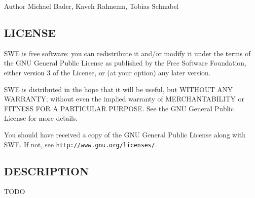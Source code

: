 \begin{DoxyAuthor}{Author}
Michael Bader, Kaveh Rahnema, Tobias Schnabel
\end{DoxyAuthor}
\hypertarget{Writer_8hh_LICENSE}{}\subsection{L\-I\-C\-E\-N\-S\-E}\label{Writer_8hh_LICENSE}
S\-W\-E is free software\-: you can redistribute it and/or modify it under the terms of the G\-N\-U General Public License as published by the Free Software Foundation, either version 3 of the License, or (at your option) any later version.

S\-W\-E is distributed in the hope that it will be useful, but W\-I\-T\-H\-O\-U\-T A\-N\-Y W\-A\-R\-R\-A\-N\-T\-Y; without even the implied warranty of M\-E\-R\-C\-H\-A\-N\-T\-A\-B\-I\-L\-I\-T\-Y or F\-I\-T\-N\-E\-S\-S F\-O\-R A P\-A\-R\-T\-I\-C\-U\-L\-A\-R P\-U\-R\-P\-O\-S\-E. See the G\-N\-U General Public License for more details.

You should have received a copy of the G\-N\-U General Public License along with S\-W\-E. If not, see \href{http://www.gnu.org/licenses/}{\tt http\-://www.\-gnu.\-org/licenses/}.\hypertarget{NetCdfWriter_8hh_DESCRIPTION}{}\subsection{D\-E\-S\-C\-R\-I\-P\-T\-I\-O\-N}\label{NetCdfWriter_8hh_DESCRIPTION}
T\-O\-D\-O 


